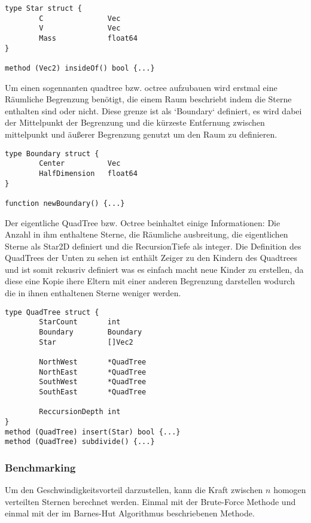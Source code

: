 \begin{lstlisting}
type Star struct {
        C               Vec
        V               Vec
        Mass            float64
}

method (Vec2) insideOf() bool {...}
\end{lstlisting}

Um einen sogennanten quadtree bzw. octree aufzubauen wird erstmal eine
Räumliche Begrenzung benötigt, die einem Raum beschriebt indem die Sterne
enthalten sind oder nicht.  Diese grenze ist als `Boundary` definiert, es wird
dabei der Mittelpunkt der Begrenzung und die kürzeste Entfernung zwischen
mittelpunkt und äußerer Begrenzung genutzt um den Raum zu definieren.

\begin{lstlisting}
type Boundary struct {
        Center          Vec
        HalfDimension   float64
}

function newBoundary() {...}
\end{lstlisting}

Der eigentliche QuadTree bzw. Octree beinhaltet einige Informationen: Die
Anzahl in ihm enthaltene Sterne, die Räumliche ausbreitung, die eigentlichen
Sterne als Star2D definiert und die RecursionTiefe als integer.  Die Definition
des QuadTrees der Unten zu sehen ist enthält Zeiger zu den Kindern des
Quadtrees und ist somit rekusriv definiert was es einfach macht neue Kinder zu
erstellen, da diese eine Kopie ihere Eltern mit einer anderen Begrenzung
darstellen wodurch die in ihnen enthaltenen Sterne weniger werden.

\begin{lstlisting}
type QuadTree struct {
        StarCount       int
        Boundary        Boundary
        Star            []Vec2

        NorthWest       *QuadTree
        NorthEast       *QuadTree
        SouthWest       *QuadTree
        SouthEast       *QuadTree

        ReccursionDepth int
}
method (QuadTree) insert(Star) bool {...}
method (QuadTree) subdivide() {...}
\end{lstlisting}

\subsubsection{Benchmarking}

Um den Geschwindigkeitsvorteil darzustellen, kann die Kraft zwischen \(n\)
homogen verteilten Sternen berechnet werden. Einmal mit der Brute-Force Methode
und einmal mit der im Barnes-Hut Algorithmus beschriebenen Methode.

